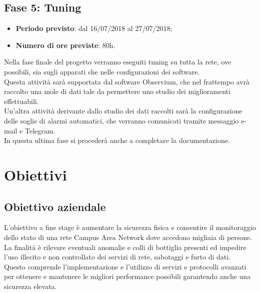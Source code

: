 \documentclass[Tesi.tex]{subfiles}
\begin{document}
\subsection{Fase 5: Tuning}
\begin{itemize}
	\item \textbf{Periodo previsto}: dal 16/07/2018 al 27/07/2018;
	\item \textbf{Numero di ore previste}: 80h.
\end{itemize}
	
Nella fase finale del progetto verranno eseguiti tuning su tutta la rete, ove possibili, sia sugli apparati che nelle configurazioni dei software. \\
Questa attività sarà supportata dal software Observium, che nel frattempo avrà raccolto una mole di dati tale da permettere uno studio dei miglioramenti effettuabili.\\
Un'altra attività derivante dallo studio dei dati raccolti sarà la configurazione delle soglie di alarmi automatici, che verranno comunicati tramite messaggio e-mail e Telegram. \\
In questa ultima fase si procederà anche a completare la documentazione. \\

\section{Obiettivi}
\subsection{Obiettivo aziendale}
L'obiettivo a fine stage è aumentare la sicurezza fisica e consentire il monitoraggio dello stato di una rete Campus Area Network dove accedono migliaia di persone. \\
La finalità è rilevare eventuali anomalie e colli di bottiglia presenti ed impedire l'uso illecito e non controllato dei servizi di rete, sabotaggi e furto di dati. \\
Questo comprende l'implementazione e l'utilizzo di servizi e protocolli avanzati per ottenere e mantenere le migliori performance possibili garantendo anche una sicurezza elevata.
\end{document}
